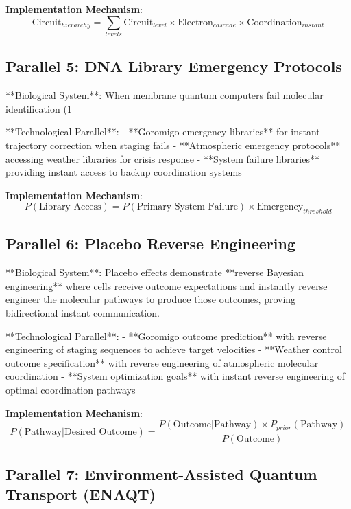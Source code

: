 \documentclass[12pt,a4paper]{article}
\begin{document}
\textbf{Implementation Mechanism}:
$$\text{Circuit}_{hierarchy} = \sum_{levels} \text{Circuit}_{level} \times \text{Electron}_{cascade} \times \text{Coordination}_{instant}$$

\subsection{Parallel 5: DNA Library Emergency Protocols}

**Biological System**: When membrane quantum computers fail molecular identification (1%

**Technological Parallel**:
- **Goromigo emergency libraries** for instant trajectory correction when staging fails
- **Atmospheric emergency protocols** accessing weather libraries for crisis response
- **System failure libraries** providing instant access to backup coordination systems

\textbf{Implementation Mechanism}:
$$P(\text{Library Access}) = P(\text{Primary System Failure}) \times \text{Emergency}_{threshold}$$

\subsection{Parallel 6: Placebo Reverse Engineering}

**Biological System**: Placebo effects demonstrate **reverse Bayesian engineering** where cells receive outcome expectations and instantly reverse engineer the molecular pathways to produce those outcomes, proving bidirectional instant communication.

**Technological Parallel**:
- **Goromigo outcome prediction** with reverse engineering of staging sequences to achieve target velocities
- **Weather control outcome specification** with reverse engineering of atmospheric molecular coordination
- **System optimization goals** with instant reverse engineering of optimal coordination pathways

\textbf{Implementation Mechanism}:
$$P(\text{Pathway}|\text{Desired Outcome}) = \frac{P(\text{Outcome}|\text{Pathway}) \times P_{prior}(\text{Pathway})}{P(\text{Outcome})}$$

\subsection{Parallel 7: Environment-Assisted Quantum Transport (ENAQT)}
\end{document}

